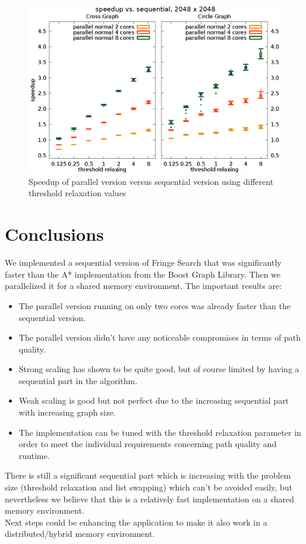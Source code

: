 \documentclass[letterpaper]{article}
\begin{document}
\begin{figure}[h]\centering
  \includegraphics[scale=0.558]{speedup_threshold.eps}
  \caption{Speedup of parallel version versus sequential version using different threshold relaxation values\label{fig:speedup_thresh}}
\end{figure}


\section{Conclusions}

We implemented a sequential version of Fringe Search that was significantly faster than the A* implementation from the Boost Graph Library. Then we parallelized it for a shared memory environment. The important results are:
\begin{itemize}
\item The parallel version running on only two cores was already faster than the sequential version.
\item The parallel version didn't have any noticeable compromises in terms of path quality.
\item Strong scaling has shown to be quite good, but of course limited by having a sequential part in the algorithm.
\item Weak scaling is good but not perfect due to the increasing sequential part with increasing graph size.
\item The implementation can be tuned with the threshold relaxation parameter in order to meet the individual requirements concerning path quality and runtime.
\end{itemize}
There is still a significant sequential part which is increasing with the problem size (threshold relaxation and list swapping) which can't be avoided easily, but nevertheless we believe that this is a relatively fast implementation on a shared memory environment.\\
Next steps could be enhancing the application to make it also work in a distributed/hybrid memory environment.





\end{document}
